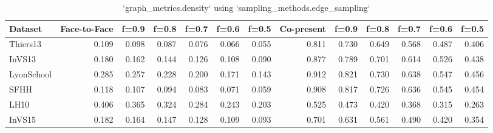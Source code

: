 \begin{table}[ht]
\begin{tabular}{lrrrrrrrrrrrr}
\hline
 Dataset    &   Face-to-Face &   f=0.9 &   f=0.8 &   f=0.7 &   f=0.6 &   f=0.5 &   Co-present &   f=0.9 &   f=0.8 &   f=0.7 &   f=0.6 &   f=0.5 \\
\hline
 Thiers13   &          0.109 &   0.098 &   0.087 &   0.076 &   0.066 &   0.055 &        0.811 &   0.730 &   0.649 &   0.568 &   0.487 &   0.406 \\
 InVS13     &          0.180 &   0.162 &   0.144 &   0.126 &   0.108 &   0.090 &        0.877 &   0.789 &   0.701 &   0.614 &   0.526 &   0.438 \\
 LyonSchool &          0.285 &   0.257 &   0.228 &   0.200 &   0.171 &   0.143 &        0.912 &   0.821 &   0.730 &   0.638 &   0.547 &   0.456 \\
 SFHH       &          0.118 &   0.107 &   0.094 &   0.083 &   0.071 &   0.059 &        0.908 &   0.817 &   0.726 &   0.636 &   0.545 &   0.454 \\
 LH10       &          0.406 &   0.365 &   0.324 &   0.284 &   0.243 &   0.203 &        0.525 &   0.473 &   0.420 &   0.368 &   0.315 &   0.263 \\
 InVS15     &          0.182 &   0.164 &   0.147 &   0.128 &   0.109 &   0.093 &        0.701 &   0.631 &   0.561 &   0.490 &   0.420 &   0.354 \\
\hline
\end{tabular}
\caption{`graph_metrics.density` using `sampling_methods.edge_sampling`}
\end{table}